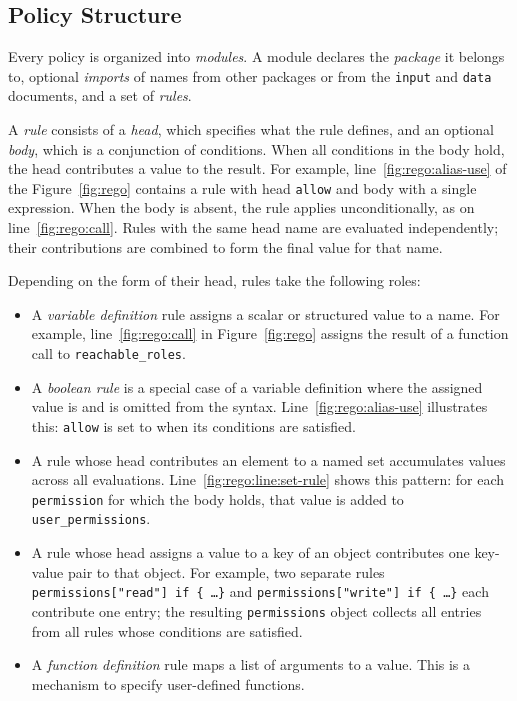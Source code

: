 \subsection{Policy Structure}
\label{ssec:rego-structure}

Every \rego policy is organized into \emph{modules}.
A module declares the \emph{package} it belongs to, optional \emph{imports} of names from other packages or from the \texttt{input} and \texttt{data} documents, and a set of \emph{rules}.

A \emph{rule} consists of a \emph{head}, which specifies what the rule defines, and an optional \emph{body}, which is a conjunction of conditions.
When all conditions in the body hold, the head contributes a value to the result.
For example, line~\ref{fig:rego:alias-use} of the Figure~\ref{fig:rego} contains a rule with head \texttt{allow} and body with a single expression.
When the body is absent, the rule applies unconditionally, as on line~\ref{fig:rego:call}.
Rules with the same head name are evaluated independently; their contributions are combined to form the final value for that name.

Depending on the form of their head, rules take the following roles:
\begin{itemize}
  \item A \emph{variable definition} rule assigns a scalar or structured value to a name.
    For example, line~\ref{fig:rego:call} in Figure~\ref{fig:rego} assigns the result of a function call to \texttt{reachable\_roles}.
  \item A \emph{boolean rule} is a special case of a variable definition where the assigned value is \true and is omitted from the syntax.
    Line~\ref{fig:rego:alias-use} illustrates this: \texttt{allow} is set to \true when its conditions are satisfied.
  \item A rule whose head contributes an element to a named set accumulates values across all evaluations.
    Line~\ref{fig:rego:line:set-rule} shows this pattern: for each \texttt{permission} for which the body holds, that value is added to \texttt{user\_permissions}.
  \item A rule whose head assigns a value to a key of an object contributes one key-value pair to that object.
    For example, two separate rules \texttt{permissions["read"] if \{ \ldots \}} and \texttt{permissions["write"] if \{ \ldots \}} each contribute one entry; the resulting \texttt{permissions} object collects all entries from all rules whose conditions are satisfied.
  \item A \emph{function definition} rule maps a list of arguments to a value.
    This is a mechanism to specify user-defined functions.
\end{itemize}


